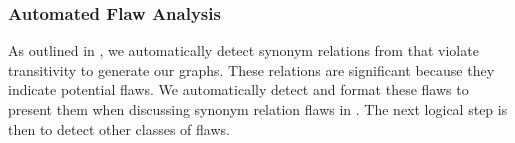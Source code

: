 
\subsubsection{Automated Flaw Analysis}\label{auto-flaw-analysis}

As outlined in , we automatically detect synonym relations
from \ourApproachGlossary{} that violate transitivity to generate our graphs.
These relations are significant because they indicate potential flaws. We
automatically detect and format these flaws to present them when discussing
synonym relation flaws in . %
The next logical step is then to detect other classes of flaws.

\ExampleFlawGraphs{}

